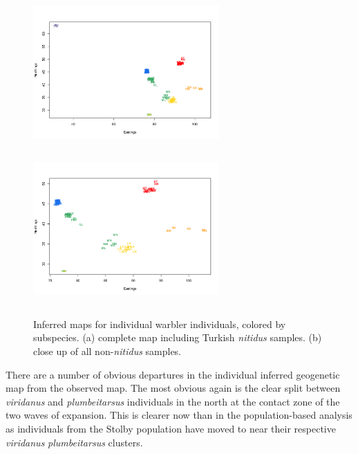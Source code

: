 \documentclass[12pt]{article}
\begin{document}

\begin{figure}
	\centering
			{\includegraphics[width=2.8in,height=2.3in]{figs/warblers/individual_warbler_map_noarrows_randpr1.png}}
			{\includegraphics[width=2.8in,height=2.3in]{figs/warblers/individual_warbler_map_noarrows_closeup_randpr1.png}}
	\caption{Inferred maps for individual warbler individuals, colored by subspecies. (a) complete map including Turkish \textit{nitidus} samples.  (b) close up of all non-\textit{nitidus} samples.}\label{sfig:warbler_inds}
\end{figure}

There are a number of obvious departures in the individual inferred geogenetic map from the observed map. The most obvious again is the clear split between \textit{viridanus} and \textit{plumbeitarsus} individuals in the north at the contact zone of the two waves of expansion.  This is clearer now than in the population-based analysis as individuals from the Stolby population have moved to near their respective \textit{viridanus} \textit{plumbeitarsus}  clusters. 
\end{document}
